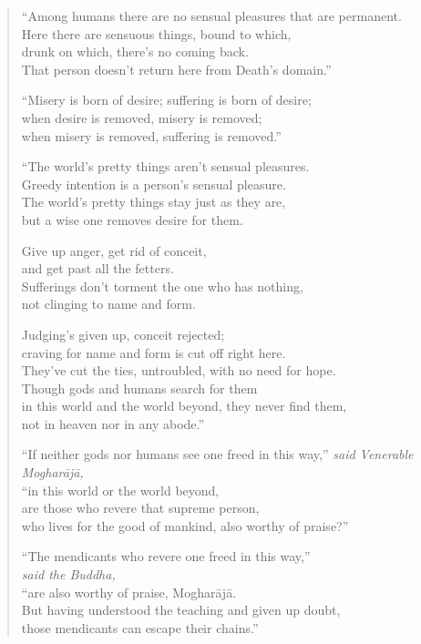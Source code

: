 \documentclass[12pt,openany]{book}%
\newcommand*{\scspeaker}[1]{\hspace{2em}\textit{#1}}
\begin{document}
\begin{verse}%
“Among humans there are no sensual pleasures that are permanent. \\
Here there are sensuous things, bound to which, \\
drunk on which, there’s no coming back. \\
That person doesn’t return here from Death’s domain.” 

“Misery is born of desire; suffering is born of desire; \\
when desire is removed, misery is removed; \\
when misery is removed, suffering is removed.” 

“The world’s pretty things aren’t sensual pleasures. \\
Greedy intention is a person’s sensual pleasure. \\
The world’s pretty things stay just as they are, \\
but a wise one removes desire for them. 

Give up anger, get rid of conceit, \\
and get past all the fetters. \\
Sufferings don’t torment the one who has nothing, \\
not clinging to name and form. 

Judging’s given up, conceit rejected; \\
craving for name and form is cut off right here. \\
They’ve cut the ties, untroubled, with no need for hope. \\
Though gods and humans search for them \\
in this world and the world beyond, they never find them, \\
not in heaven nor in any abode.” 

“If neither gods nor humans see one freed in this way,” \scspeaker{said Venerable \textsanskrit{Mogharājā}, }\\
“in this world or the world beyond, \\
are those who revere that supreme person, \\
who lives for the good of mankind, also worthy of praise?” 

“The mendicants who revere one freed in this way,” \\
\scspeaker{said the Buddha, }\\
“are also worthy of praise, \textsanskrit{Mogharājā}. \\
But having understood the teaching and given up doubt, \\
those mendicants can escape their chains.” 

%
\end{verse}
\end{document}
